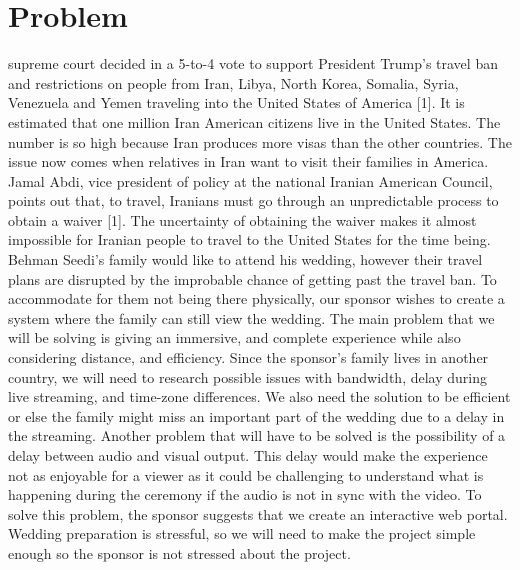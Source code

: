 \documentclass[onecolumn, draftclsnofoot,10pt, compsoc]{IEEEtran}
\begin{document}
\section{Problem}
 supreme court decided in a 5-to-4 vote to support President Trump’s travel ban and restrictions on people from Iran, Libya, North Korea, Somalia, Syria, Venezuela and Yemen traveling into the United States of America [1]. 
It is estimated that one million Iran American citizens live in the United States. 
The number is so high because Iran produces more visas than the other countries. 
The issue now comes when relatives in Iran want to visit their families in America.
Jamal Abdi, vice president of policy at the national Iranian American Council, points out that, to travel, Iranians must go through an unpredictable process to obtain a waiver [1]. 
The uncertainty of obtaining the waiver makes it almost impossible for Iranian people to travel to the United States for the time being. 
Behman Seedi's family would like to attend his wedding, however their travel plans are disrupted by the improbable chance of getting past the travel ban. 
To accommodate for them not being there physically, our sponsor wishes to create a system where the family can still view the wedding.
The main problem that we will be solving is giving an immersive, and complete experience while also considering distance, and efficiency.
Since the sponsor's family lives in another country, we will need to research possible issues with bandwidth, delay during live streaming, and time-zone differences.
We also need the solution to be efficient or else the family might miss an important part of the wedding due to a delay in the streaming.
Another problem that will have to be solved is the possibility of a delay between audio and visual output. 
This delay would make the experience not as enjoyable for a viewer as it could be challenging to understand what is happening during the ceremony if the audio is not in sync with the video.
To solve this problem, the sponsor suggests that we create an interactive web portal. 
Wedding preparation is stressful, so we will need to make the project simple enough so the sponsor is not stressed about the project. 
\newline 
\end{document}
